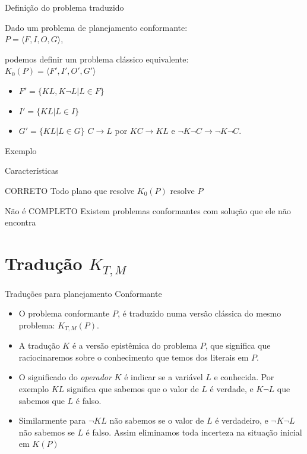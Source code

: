 \begin{frame}{Definição do problema traduzido}

    Dado um problema de planejamento conformante:\\
    $P=\langle F, I, O, G\rangle$,
    
    podemos definir um problema clássico equivalente:\\
    $K_0(P)=\langle F', I', O', G'\rangle$
    \begin{itemize}
        \item $F' = \{ KL, K \lnot L | L \in F \}$
        \item $I' = \{ KL | L \in I \}$
        \item $G' = \{ KL | L \in G \}$
        $C \rightarrow L$ por $KC \rightarrow KL$ e $\lnot K \lnot C \rightarrow \lnot K \lnot C$. 
    \end{itemize}  
\end{frame}



\begin{frame}{Exemplo}
    
\end{frame}

\begin{frame}{Características}
    \begin{block}{CORRETO}
        Todo plano que resolve $K_0(P)$ resolve $P$
    \end{block}
    \begin{block}{Não é COMPLETO}
        Existem problemas conformantes com solução que ele não encontra
    \end{block}
    
    
\end{frame}

\section{Tradução $K_{T,M}$}


\begin{frame}{Traduções para planejamento Conformante}
\begin{itemize}
\item O problema conformante $P$, é traduzido numa versão clássica do mesmo 
problema: $K_{T,M}(P)$. 
\item A tradução $K$ é a versão epistêmica do problema $P$, que significa que 
raciocinaremos sobre o conhecimento que temos dos literais em $P$.
\item O significado do \textit{operador} $K$ é indicar se a variável $L$ e 
conhecida. Por exemplo $KL$ significa que sabemos que o valor de $L$ é verdade, 
e $K \lnot L$ que sabemos que $L$ é falso.
\item Similarmente para $\lnot KL$ não sabemos se o valor de $L$ é verdadeiro, e 
$\lnot K \lnot L$ não sabemos se $L$ é falso. Assim eliminamos toda incerteza na 
situação inicial em $K(P)$ %
\end{itemize}  
\end{frame}

